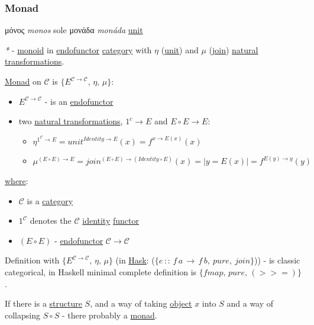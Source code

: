 \documentclass[a4paper,14pt,oneside]{book}
\begin{document}
\subsubsection{\label{org7f47037}Monad}
\label{sec:org1fa9825}
\textgreek{μόνος} \emph{monos} sole
\textgreek{μονάδα} \emph{monáda} \hyperref[orgddab1d1]{unit}

\emph{*} - \hyperref[org2ed215c]{monoid} in \hyperref[org85377f6]{endofunctor} \hyperref[org62e5296]{category} with \(\eta\) (\hyperref[orgddab1d1]{unit}) and \(\mu\) (\hyperref[orgcc87e76]{join}) \hyperref[org9c512a7]{natural transformations}.

\hyperref[org7f47037]{Monad} on \(\mathcal{C}\) is \(\{E^{\mathcal{C \to C}}, \, \eta, \, \mu\}\):
\begin{itemize}
\item \(E^{\mathcal{C \to C}}\) - is an \hyperref[org85377f6]{endofunctor}
\item two \hyperref[org9c512a7]{natural transformations}, \(1^c \to E\) and \(E \circ E \to E\):
\begin{itemize}
\item \(\eta^{1^{\mathcal{C}} \to E} = {unit}^{Identity \to E}(x) = f^{ x \to E(x)}(x)\)
\item \(\mu^{(E \circ E) \to E} = {join}^{(E \circ E) \to (Identity \circ E)}(x) = | y = E(x) | = f^{E (y) \to y}(y)\)
\end{itemize}
\end{itemize}

\hyperref[org7fcc1e1]{where}:
\begin{itemize}
\item \(\mathcal{C}\) is a \hyperref[org62e5296]{category}
\item \(1^{\mathcal{C}}\) denotes the \(\mathcal{C}\) \hyperref[org743971b]{identity} \hyperref[org3f64a05]{functor}
\item \((E \circ E)\) - \hyperref[org85377f6]{endofunctor} \(\mathcal{C \to C}\)
\end{itemize}

Definition with \(\{E^{\mathcal{C \to C}}, \, \eta, \, \mu\}\) (in \hyperref[orgd83b003]{Hask}: (\(\{e \, :: \, f \, a \, \to \, f \, b, \ pure, \ join\}\))) - is classic categorical, in Haskell minimal complete definition is \(\{fmap, \, pure, \, (>>=)\}\).

If there is a \hyperref[org733a486]{structure} \(S\), and a way of taking \hyperref[org32ba1f2]{object} \(x\) into \(S\) and a way of collapsing \(S \circ S\) - there probably a \hyperref[org7f47037]{monad}.
\end{document}
